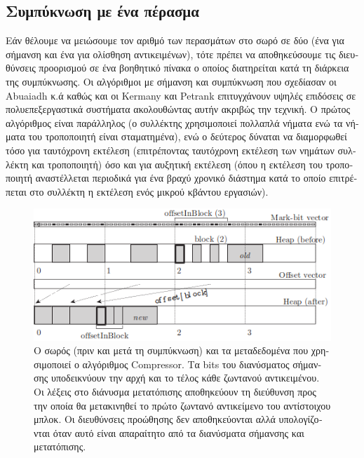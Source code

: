 \begin{greek}
\section{Συμπύκνωση με ένα πέρασμα}
Εάν θέλουμε να μειώσουμε τον αριθμό των περασμάτων στο σωρό σε δύο (ένα για 
σήμανση και ένα για ολίσθηση αντικειμένων), τότε πρέπει να αποθηκεύσουμε τις 
διευθύνσεις προορισμού σε ένα βοηθητικό πίνακα ο οποίος διατηρείται κατά τη 
διάρκεια της συμπύκνωσης. Οι αλγόριθμοι με σήμανση και συμπύκνωση που σχεδίασαν 
οι Abuaiadh κ.ά \cite{DBLP:conf/oopsla/AbuaiadhOPS04} καθώς και οι Kermany και 
Petrank \cite{DBLP:conf/pldi/KermanyP06} επιτυγχάνουν υψηλές επιδόσεις σε 
πολυεπεξεργαστικά συστήματα ακολουθώντας αυτήν ακριβώς την τεχνική. Ο πρώτος 
αλγόριθμος είναι παράλληλος (ο συλλέκτης χρησιμοποιεί πολλαπλά νήματα ενώ τα 
νήματα του τροποποιητή είναι σταματημένα), ενώ ο δεύτερος δύναται να διαμορφωθεί 
τόσο για ταυτόχρονη εκτέλεση (επιτρέποντας ταυτόχρονη εκτέλεση των νημάτων 
συλλέκτη και τροποποιητή) όσο και για αυξητική εκτέλεση (όπου η εκτέλεση του
τροποποιητή αναστέλλεται περιοδικά για ένα βραχύ χρονικό διάστημα κατά το οποίο
επιτρέπεται στο συλλέκτη η εκτέλεση ενός μικρού κβάντου εργασιών). 

\begin{figure}
  \centering
  \includegraphics{figures/mrkcmp_2}
  \caption[Ο σωρός (πριν και μετά τη συμπύκνωση) και τα μεταδεδομένα
           που χρησιμοποιεί ο αλγόριθμος Compressor.]
    {Ο σωρός (πριν και μετά τη συμπύκνωση) και τα μεταδεδομένα
     που χρησιμοποιεί ο αλγόριθμος Compressor. Τα bits του διανύσματος
     σήμανσης υποδεικνύουν την αρχή και το τέλος κάθε ζωντανού
     αντικειμένου. Οι λέξεις στο διάνυσμα μετατόπισης αποθηκεύουν
     τη διεύθυνση προς την οποία θα μετακινηθεί το πρώτο ζωντανό
     αντικείμενο του αντίστοιχου μπλοκ. Οι διευθύνσεις προώθησης
     δεν αποθηκεύονται αλλά υπολογίζονται όταν αυτό είναι απαραίτητο
     από τα διανύσματα σήμανσης και μετατόπισης.}
  \label{fig:mrkcmp_2}
\end{figure}


\end{greek}
